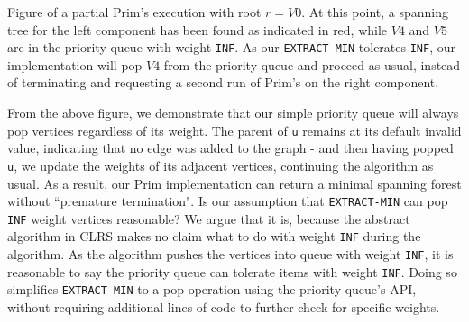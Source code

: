 \begin{center}
\newline
Figure of a partial Prim's execution with root $r = V0$. At this point, a spanning tree for the left component has been found as indicated in red, while $V4$ and $V5$ are in the priority queue with weight \texttt{INF}. As our \texttt{EXTRACT-MIN} tolerates \texttt{INF}, our implementation will pop $V4$ from the priority queue and proceed as usual, instead of terminating and requesting a second run of Prim's on the right component.
\newline
\end{center}
From the above figure, we demonstrate that our simple priority queue will always pop vertices regardless of its weight. The parent of \texttt{u} remains at its default invalid value, indicating that no edge was added to the graph - and then having popped \texttt{u}, we update the weights of its adjacent vertices, continuing the algorithm as usual. As a result, our Prim implementation can return a minimal spanning forest without ``premature termination".
\newline\newline
Is our assumption that \texttt{EXTRACT-MIN} can pop \texttt{INF} weight vertices reasonable? We argue that it is, because the abstract algorithm in CLRS makes no claim what to do with weight \texttt{INF} during the algorithm. As the algorithm pushes the vertices into queue with weight \texttt{INF}, it is reasonable to say the priority queue can tolerate items with weight \texttt{INF}. Doing so simplifies \texttt{EXTRACT-MIN} to a pop operation using the priority queue's API, without requiring additional lines of code to further check for specific weights.
\newline\newline
